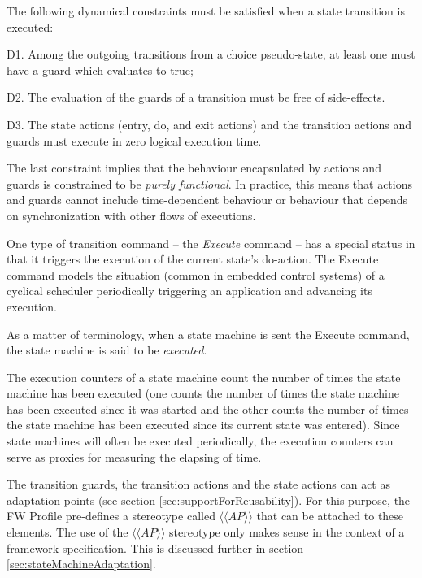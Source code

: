 \documentclass[definition]{../fwprofile}
\begin{document}
The following dynamical constraints must be satisfied when a state transition is executed:

\begin{fw_itemize} 
\item D1. Among the outgoing transitions from a choice pseudo-state, at least one must have a
guard which evaluates to true;
\item D2. The evaluation of the guards of a transition must be free of side-effects.
\item D3. The state
actions (entry, do, and exit actions) and the transition actions and guards must execute
in zero logical execution time.
\end{fw_itemize}

The last constraint implies that the behaviour encapsulated by actions and guards is
constrained to be \emph{purely functional}. In practice, this means that actions and guards cannot
include time-dependent behaviour or behaviour that depends on synchronization with other
flows of executions.

One type of transition command – the \emph{Execute} command – has a special status in that it
triggers the execution of the current state's do-action. The Execute command models the
situation (common in embedded control systems) of a cyclical scheduler periodically
triggering an application and advancing its execution.

As a matter of terminology, when a state machine is sent the Execute command, the state
machine is said to be \emph{executed}.

The execution counters of a state machine count the number of times the state machine has
been executed (one counts the number of times the state machine has been executed since it 
was started and the other counts the number of times the state machine has been executed
since its current state was entered). Since state machines will often be executed periodically,
the execution counters can serve as proxies for measuring the elapsing of time.

The transition guards, the transition actions and the state actions can act as adaptation points
(see section \ref{sec:supportForReusability}). 
For this purpose, the FW Profile pre-defines a stereotype called $\langle\langle AP \rangle\rangle$ that
can be attached to these elements. The use of the $\langle\langle AP \rangle\rangle$ stereotype only makes sense in the
context of a framework specification. This is discussed further in section \ref{sec:stateMachineAdaptation}.
\end{document}
